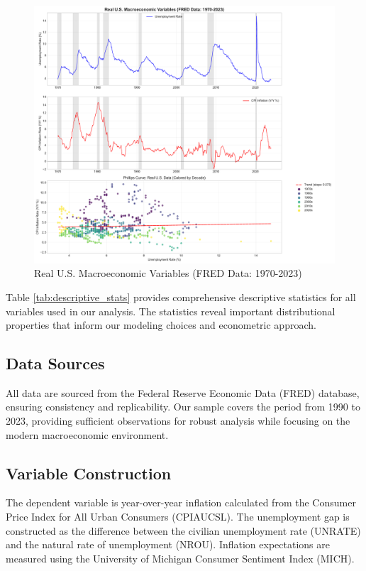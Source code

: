 \documentclass[12pt]{article}
\begin{document}
\begin{figure}[H]
\centering
\includegraphics[width=\textwidth]{figures/time_series_overview.pdf}
\caption{Real U.S. Macroeconomic Variables (FRED Data: 1970-2023)}
\label{fig:time_series}
\end{figure}

Table \ref{tab:descriptive_stats} provides comprehensive descriptive statistics for all variables used in our analysis. The statistics reveal important distributional properties that inform our modeling choices and econometric approach.



\subsection{Data Sources}

All data are sourced from the Federal Reserve Economic Data (FRED) database, ensuring consistency and replicability. Our sample covers the period from 1990 to 2023, providing sufficient observations for robust analysis while focusing on the modern macroeconomic environment.

\subsection{Variable Construction}

The dependent variable is year-over-year inflation calculated from the Consumer Price Index for All Urban Consumers (CPIAUCSL). The unemployment gap is constructed as the difference between the civilian unemployment rate (UNRATE) and the natural rate of unemployment (NROU). Inflation expectations are measured using the University of Michigan Consumer Sentiment Index (MICH).
\end{document}
